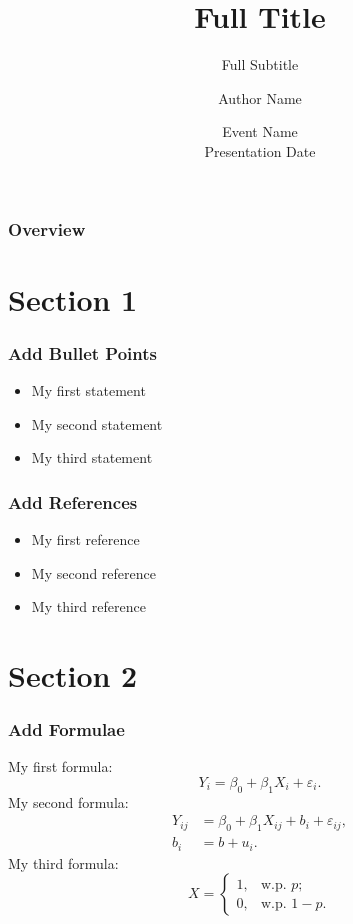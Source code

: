 \documentclass[leqno]{beamer}
\title[Short Title]{Full Title}
\subtitle[Short Subtitle]{Full Subtitle}
\author[Author Name]{{\sc Author Name}}
\institute[Institution]{Department Name \\ Institution Name}
\date[Date]{Event Name \\ Presentation Date}
\begin{document}
	
	\begin{frame}[plain]
		\titlepage
	\end{frame}
	
	\begin{frame}
		\frametitle{Overview}
		\begin{NoHyper}
			\tableofcontents
		\end{NoHyper}
	\end{frame}
	
	\section{Section 1}
	
	\begin{frame}
		\frametitle{Add Bullet Points}
		\begin{itemize}
			\item My first statement
			\item My second statement
			\item My third statement
		\end{itemize}
	\end{frame}
	
	\begin{frame}
		\frametitle{Add References}
		\begin{itemize}
			\item My first reference~\citep{ref1}
			\item My second reference~\citep{ref2}
			\item My third reference~\citep[][Chapter 1]{ref3}
		\end{itemize}
	\end{frame}
	
	\section{Section 2}
	
	\begin{frame}
		\frametitle{Add Formulae}
		My first formula:
		\[Y_{i} = \beta_0 + \beta_1 X_i + \varepsilon_i.\]
		My second formula:
		\begin{align}
			Y_{ij} &= \beta_0 + \beta_1 X_{ij} + b_{i} + 
			\varepsilon_{ij}, \label{eq:myeq1}
			\\ b_i &= b + u_i. \label{eq:myeq2}
		\end{align}
		My third formula:
		\[
		X = 
		\begin{cases}
			1, &\text{w.p. } p;
			\\0, &\text{w.p. } 1 - p.
		\end{cases} 	
		\]
	\end{frame}
	
\end{document}
